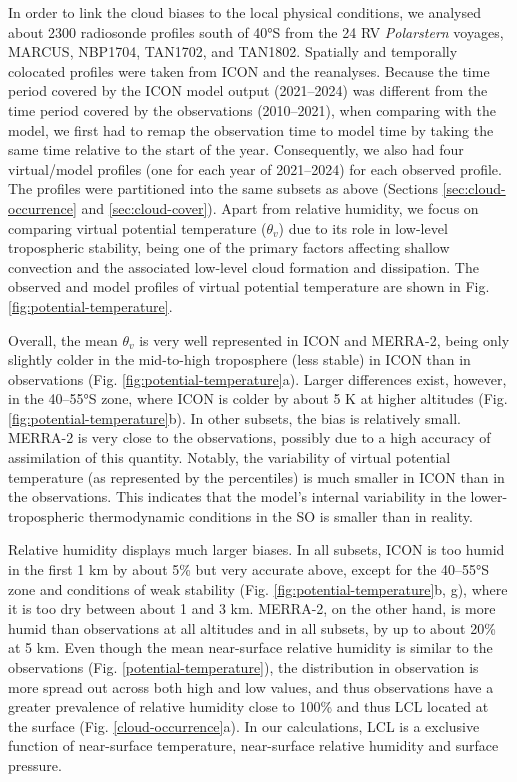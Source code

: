 \documentclass[12pt,a4paper]{article}
\begin{document}
In order to link the cloud biases to the local physical conditions, we analysed
about 2300 radiosonde profiles south of 40°S from the 24 RV \emph{Polarstern}
voyages, MARCUS, NBP1704, TAN1702, and TAN1802. Spatially and temporally
colocated profiles were taken from ICON and the reanalyses.  Because the time
period covered by the ICON model output (2021--2024) was different from the
time period covered by the observations (2010--2021), when comparing with the
model, we first had to remap the observation time to model time by taking the
same time relative to the start of the year. Consequently, we also had four
virtual/model profiles (one for each year of 2021--2024) for each observed
profile.  The profiles were partitioned into the same subsets as above
(Sections \ref{sec:cloud-occurrence} and \ref{sec:cloud-cover}).  Apart from
relative humidity, we focus on comparing virtual potential temperature
($\theta_v$) due to its role in low-level tropospheric stability, being one of
the primary factors affecting shallow convection and the associated low-level
cloud formation and dissipation. The observed and model profiles of virtual
potential temperature are shown in Fig. \ref{fig:potential-temperature}.

Overall, the mean $\theta_v$ is very well represented in ICON and MERRA-2,
being only slightly colder in the mid-to-high troposphere (less stable) in ICON
than in observations (Fig. \ref{fig:potential-temperature}a).  Larger
differences exist, however, in the 40--55°S zone, where ICON is colder by about
5 K at higher altitudes (Fig.  \ref{fig:potential-temperature}b). In other
subsets, the bias is relatively small. MERRA-2 is very close to the
observations, possibly due to a high accuracy of assimilation of this quantity.
Notably, the variability of virtual potential temperature (as represented by
the percentiles) is much smaller in ICON than in the observations. This
indicates that the model's internal variability in the lower-tropospheric
thermodynamic conditions in the SO is smaller than in reality.

Relative humidity displays much larger biases. In all subsets, ICON is too
humid in the first 1 km by about 5\% but very accurate above, except for the
40--55°S zone and conditions of weak stability (Fig.
\ref{fig:potential-temperature}b, g),  where it is too dry between about 1 and
3 km. MERRA-2, on the other hand, is more humid than observations at all
altitudes and in all subsets, by up to about 20\% at 5 km. Even though the mean
near-surface relative humidity is similar to the observations (Fig.
\ref{potential-temperature}), the distribution in observation is more spread
out across both high and low values, and thus observations have a greater
prevalence of relative humidity close to 100\% and thus LCL located at the
surface (Fig. \ref{cloud-occurrence}a). In our calculations, LCL is a exclusive
function of near-surface temperature, near-surface relative humidity and
surface pressure.
\end{document}

